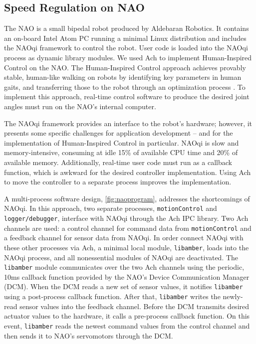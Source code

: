 \subsection{Speed Regulation on NAO}

\label{sec:nao_walking}


The NAO is a small bipedal robot produced by Aldebaran Robotics.  It
contains an on-board Intel Atom PC running a minimal Linux
distribution and includes the NAOqi framework to control the robot.
User code is loaded into the NAOqi process as dynamic library modules.
We used Ach to implement Human-Inspired Control \cite{Ames:NAO:2012}
on the NAO.  The Human-Inspired Control approach achieves provably
stable, human-like walking on robots by identifying key parameters in
human gaits, and transferring those to the robot through an
optimization process \cite{Ames11}.  To implement this approach,
real-time control software to produce the desired joint angles must
run on the NAO's internal computer.


The NAOqi framework provides an interface to the robot's hardware;
however, it presents some specific challenges for application
development -- and for the implementation of Human-Inspired Control in
particular.  NAOqi is slow and memory-intensive, consuming at idle
15\% of available CPU time and 20\% of available memory.
Additionally, real-time user code must run as a callback function,
which is awkward for the desired controller implementation.  Using Ach
to move the controller to a separate process improves the
implementation.


A multi-process software design, \autoref{fig:naoprogram}, addresses
the shortcomings of NAOqi. In this approach, two separate processes,
{\tt motionControl} and {\tt logger/debugger}, interface with NAOqi
through the Ach IPC library. Two Ach channels are used: a control
channel for command data from {\tt motionControl} and a feedback
channel for sensor data from NAOqi. In order connect NAOqi with these
other processes via Ach, a minimal local module, {\tt libamber}, loads
into the NAOqi process, and all nonessential modules of NAOqi are
deactivated.  The {\tt libamber} module communicates over the two Ach
channels using the periodic, 10ms callback function provided by the
NAO's Device Communication Manager (DCM). When the DCM reads a new set
of sensor values, it notifies {\tt libamber} using a post-process
callback function. After that, {\tt libamber} writes the newly-read
sensor values into the feedback channel.  Before the DCM transmits
desired actuator values to the hardware, it calls a pre-process
callback function. On this event, {\tt libamber} reads the newest
command values from the control channel and then sends it to NAO's
servomotors through the DCM.

